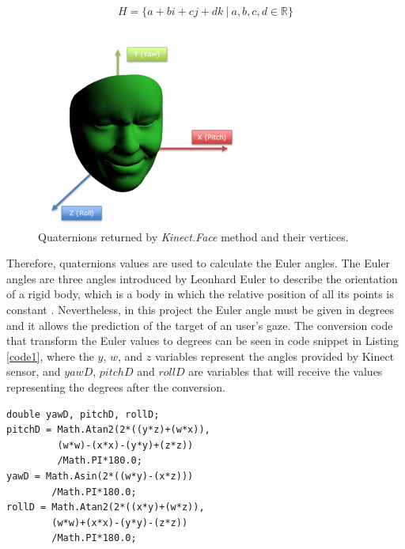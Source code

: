 \documentclass[10pt, conference]{IEEEtran}
\begin{document}
    \begin{equation}
		H = \{a+ bi + cj + dk ~ \vert ~ a, b, c, d \in \mathbb{R} \}
        \label{eq:quaternion}
	\end{equation}

\begin{figure}[t]
	\centering
	\includegraphics{figures/pic4.png}
    \caption{Quaternions returned by \emph{Kinect.Face} method and their vertices.}
    \label{fig:fig4}
\end{figure}

	Therefore, quaternions values are used to calculate the Euler angles. 
	The Euler angles are three angles introduced by Leonhard Euler to describe the orientation of a rigid body, which is a body in which the relative position of all its points is constant \cite{12}. 
	Nevertheless, in this project the Euler angle must be given in degrees and it allows the prediction of the target of an user's gaze.
	The conversion code that transform the Euler values to degrees can be seen in code snippet in Listing \ref{code1}, where the $y$, $w$, and $z$ variables represent the angles provided by Kinect sensor, and $yawD$, $pitchD$ and $rollD$ are variables that will receive the values representing the degrees after the conversion.
   

\begin{lstlisting}[caption = Convert face rotation quaternion to Euler angles in degrees., label={code1}]
double yawD, pitchD, rollD;
pitchD = Math.Atan2(2*((y*z)+(w*x)),
		 (w*w)-(x*x)-(y*y)+(z*z))
         /Math.PI*180.0;
yawD = Math.Asin(2*((w*y)-(x*z)))
		/Math.PI*180.0;
rollD = Math.Atan2(2*((x*y)+(w*z)),
		(w*w)+(x*x)-(y*y)-(z*z))
        /Math.PI*180.0;
\end{lstlisting}
\end{document}
